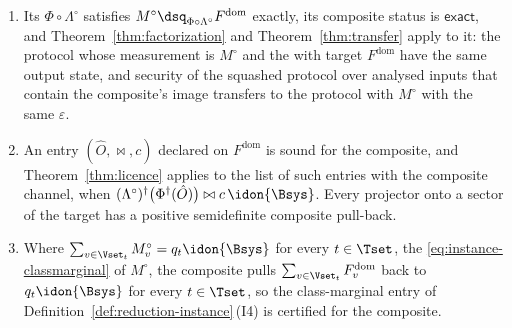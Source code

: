\begin{corollary}
\begin{enumerate}[label=(\roman*),leftmargin=3.0em]
  segment a  (Definition~\ref{def:chain}).
\item Its  $\Phi\circ\Lambda^{\circ}$ satisfies
  $M^{\circ}\dsq_{\Phi\circ\Lambda^{\circ}}F^{\mathrm{dom}}$ exactly,
  its composite status is $\textsf{exact}$, and
  Theorem~\ref{thm:factorization} and Theorem~\ref{thm:transfer} apply to
  it: the protocol whose measurement is $M^{\circ}$ and the  with target $F^{\mathrm{dom}}$ have the same output state, and
  security of the squashed protocol over analysed inputs that contain the
  composite's image transfers to the protocol with $M^{\circ}$ with the
  same $\varepsilon$.
\item An entry $(\hat O,\bowtie,c)$ declared on $F^{\mathrm{dom}}$ is sound for
  the composite, and Theorem~\ref{thm:licence} applies to the list of such
  entries with the composite channel, when
  $(\Lambda^{\circ})^{\dagger}\big(\Phi^{\dagger}(\hat O)\big)\bowtie
  c\,\idon{\Bsys}$. Every projector onto a sector of the target has a
  positive semidefinite composite pull-back.
\item Where $\sum_{v\in\Vset_t}M^{\circ}_v=q_t\idon{\Bsys}$ for every
  $t\in\Tset$, the 
  \eqref{eq:instance-classmarginal} of $M^{\circ}$, the composite pulls
  $\sum_{v\in\Vset_t}F^{\mathrm{dom}}_v$ back to $q_t\idon{\Bsys}$ for every
  $t\in\Tset$, so the class-marginal entry of
  Definition~\ref{def:reduction-instance}\,(I4) is certified for the
  composite.
\end{enumerate}
\end{corollary}

